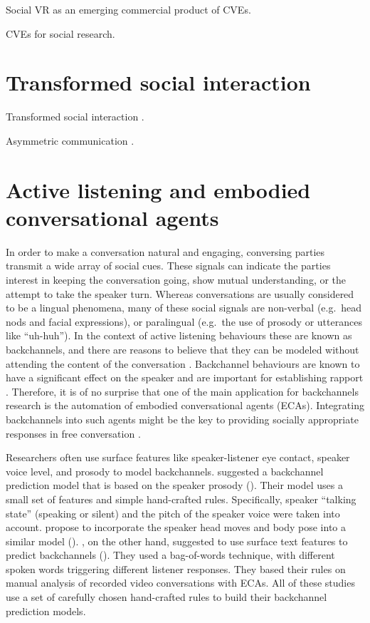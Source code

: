 \documentclass[]{simple-thesis}
\begin{document}
Social VR as an emerging commercial product of CVEs.

CVEs for social research.

\section{Transformed social interaction}

Transformed social interaction \citep{Bailenson2004, Bailenson2008}.

Asymmetric communication \citep{Chou2016, Yee2007, Dominguez2014}.

\section{Active listening and embodied conversational agents}

In order to make a conversation natural and engaging, conversing parties transmit a wide array of social cues.
These signals can indicate the parties interest in keeping the conversation going, show mutual understanding, or the attempt to take the speaker turn.
Whereas conversations are usually considered to be a lingual phenomena, many of these social signals are non-verbal (e.g.\ head nods and facial expressions), or paralingual (e.g.\ the use of prosody or utterances like ``uh-huh'').
In the context of active listening behaviours these are known as backchannels, and there are reasons to believe that they can be modeled without attending the content of the conversation \citep{Yngve1970}.
Backchannel behaviours are known to have a significant effect on the speaker \citep{Bavelas2000} and are important for establishing rapport \citep{Gratch2007}.
Therefore, it is of no surprise that one of the main application for backchannels research is the automation of embodied conversational agents (ECAs).
Integrating backchannels into such agents might be the key to providing socially appropriate responses in free conversation \citep{Morency2008, Bevacqua2008}.

Researchers often use surface features like speaker-listener eye contact, speaker voice level, and prosody to model backchannels.
\citeauthor{Ward2000} suggested a backchannel prediction model that is based on the speaker prosody (\citeyear{Ward2000}).
Their model uses a small set of features and simple hand-crafted rules.
Specifically, speaker ``talking state'' (speaking or silent) and the pitch of the speaker voice were taken into account.
\citeauthor{Gratch2006} propose to incorporate the speaker head moves and body pose into a similar model (\citeyear{Gratch2006}).
\citeauthor{Lee2006}, on the other hand, suggested to use surface text features to predict backchannels (\citeyear{Lee2006}).
They used a bag-of-words technique, with different spoken words triggering different listener responses.
They based their rules on manual analysis of recorded video conversations with ECAs.
All of these studies use a set of carefully chosen hand-crafted rules to build their backchannel prediction models.
\end{document}
